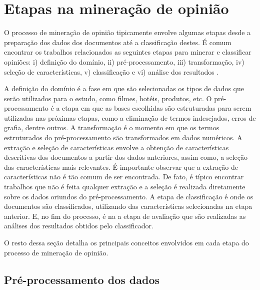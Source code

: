 \documentclass[template.tex]{subfiles}
\begin{document}
\section{Etapas na mineração de opinião}


O processo de mineração de opinião tipicamente envolve algumas etapas desde a preparação dos dados dos documentos até a classificação destes. É comum encontrar os trabalhos relacionados as seguintes etapas para minerar e classificar opiniões:  i) definição do domínio, ii) pré-processamento, iii) transformação, iv) seleção de características, v) classificação e vi) análise dos resultados \cite{moraes2012document}. 

A definição do domínio é a fase em que são selecionadas os tipos de dados que serão utilizados para o estudo, como filmes, hotéis, produtos, etc. O pré-processamento é a etapa em que as bases escolhidas são estruturadas para serem utilizadas nas próximas etapas, como a eliminação de termos indesejados, erros de grafia, dentre outros. A transformação é o momento em que os termos estruturados do pré-processamento são transformados em dados numéricos. A extração e seleção de características envolve a obtenção de características descritivas dos documentos a partir dos dados anteriores, assim como, a seleção das características mais relevantes. É importante observar que a extração de características não é tão comum de ser encontrada. De fato, é típico encontrar trabalhos que não é feita qualquer extração e a seleção é realizada diretamente sobre os dados oriundos do pré-processamento. A etapa de classificação é onde os documentos são classificados, utilizando das características selecionadas na etapa anterior. E, no fim do processo, é na a etapa de avaliação que são realizadas as análises dos resultados obtidos pelo classificador.

O resto dessa seção detalha os principais conceitos envolvidos em cada etapa do processo de mineração de opinião.

\subsection{Pré-processamento dos dados}
\end{document}
